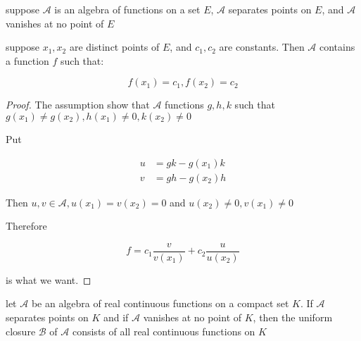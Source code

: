 \begin{thm}
    suppose $\mathscr{A}$ is an algebra of functions on a set $E$, $\mathscr{A}$ separates
    points on $E$, and $\mathscr{A}$ vanishes at no point of $E$

    suppose $x_1,x_2$ are distinct points of $E$, and $c_1,c_2$ are constants.
    Then $\mathscr{A}$ contains a function $f$ such that:

    \[
        f(x_1) = c_1, f(x_2) = c_2
    \]

\end{thm}

\begin{proof}
    The assumption show that $\mathscr{A}$ functions $g,h,k$ such that
    $g(x_1) \ne g(x_2), h(x_1) \ne 0, k(x_2) \ne 0$

    Put

    \begin{align*}
        u &= gk - g(x_1)k \\
        v &= gh - g(x_2) h
    \end{align*}

    Then $u,v \in \mathscr{A}, u(x_1) = v(x_2) = 0$ and $u(x_2) \ne 0, v(x_1) \ne 0$

    Therefore

    \[
        f = c_1 \frac{v}{v(x_1)}  + c_2 \frac{u}{u(x_2)}
    \]

    is what we want.
\end{proof}

\begin{thm}
    let $\mathscr{A}$ be an algebra of real continuous functions on a compact set $K$.
    If $\mathscr{A}$ separates points on $K$ and if $\mathscr{A}$ vanishes at no point of $K$,
    then the uniform closure $\mathscr{B}$ of $\mathscr{A}$ consists of all real continuous 
    functions on $K$
\end{thm}

